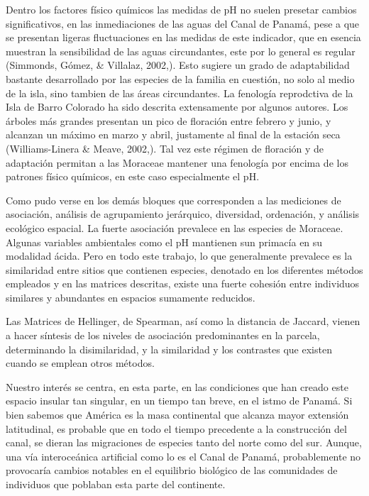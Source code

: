 \documentclass[11pt,]{article}
\begin{document}
Dentro los factores físico químicos las medidas de pH no suelen presetar
cambios significativos, en las inmediaciones de las aguas del Canal de
Panamá, pese a que se presentan ligeras fluctuaciones en las medidas de
este indicador, que en esencia muestran la sensibilidad de las aguas
circundantes, este por lo general es regular (Simmonds, Gómez, \&
Villalaz, 2002,). Esto sugiere un grado de adaptabilidad bastante
desarrollado por las especies de la familia en cuestión, no solo al
medio de la isla, sino tambien de las áreas circundantes. La fenología
reprodctiva de la Isla de Barro Colorado ha sido descrita extensamente
por algunos autores. Los árboles más grandes presentan un pico de
floración entre febrero y junio, y alcanzan un máximo en marzo y abril,
justamente al final de la estación seca (Williams-Linera \& Meave,
2002,). Tal vez este régimen de floración y de adaptación permitan a las
Moraceae mantener una fenología por encima de los patrones físico
químicos, en este caso especialmente el pH.

Como pudo verse en los demás bloques que corresponden a las mediciones
de asociación, análisis de agrupamiento jerárquico, diversidad,
ordenación, y análisis ecológico espacial. La fuerte asociación
prevalece en las especies de Moraceae. Algunas variables ambientales
como el pH mantienen sun primacía en su modalidad ácida. Pero en todo
este trabajo, lo que generalmente prevalece es la similaridad entre
sitios que contienen especies, denotado en los diferentes métodos
empleados y en las matrices descritas, existe una fuerte cohesión entre
individuos similares y abundantes en espacios sumamente reducidos.

Las Matrices de Hellinger, de Spearman, así como la distancia de
Jaccard, vienen a hacer síntesis de los niveles de asociación
predominantes en la parcela, determinando la disimilaridad, y la
similaridad y los contrastes que existen cuando se emplean otros
métodos.

Nuestro interés se centra, en esta parte, en las condiciones que han
creado este espacio insular tan singular, en un tiempo tan breve, en el
istmo de Panamá. Si bien sabemos que América es la masa continental que
alcanza mayor extensión latitudinal, es probable que en todo el tiempo
precedente a la construcción del canal, se dieran las migraciones de
especies tanto del norte como del sur. Aunque, una vía interoceánica
artificial como lo es el Canal de Panamá, probablemente no provocaría
cambios notables en el equilibrio biológico de las comunidades de
individuos que poblaban esta parte del continente.
\end{document}
